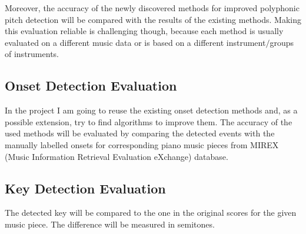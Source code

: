\documentclass[11pt]{article} %
\begin{document}
Moreover, the accuracy of the newly discovered methods for improved polyphonic pitch detection will be compared with the results of the existing methods. Making this evaluation reliable is challenging though, because each method is usually evaluated on a different music data or is based on a different instrument$/$groups of instruments.

\subsection{Onset Detection Evaluation}
In the project I am going to reuse the existing onset detection methods and, as a possible extension, try to find algorithms to improve them. The accuracy of the used methods will be evaluated by comparing the detected events with the manually labelled onsets for corresponding piano music pieces from MIREX (Music Information Retrieval Evaluation eXchange) database. 

\subsection{Key Detection Evaluation}
The detected key will be compared to the one in the original scores for the given music piece. The difference will be measured in semitones.




\end{document}
